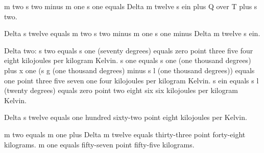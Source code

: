 m two s two minus m one s one equals Delta m twelve s ein plus Q over T plus s two.

Delta s twelve equals m two s two minus m one s one minus Delta m twelve s ein.

Delta two:
s two equals s one (seventy degrees) equals zero point three five four eight kilojoules per kilogram Kelvin.
s one equals s one (one thousand degrees) plus x one (s g (one thousand degrees) minus s l (one thousand degrees)) equals one point three five seven one four kilojoules per kilogram Kelvin.
s ein equals s l (twenty degrees) equals zero point two eight six six kilojoules per kilogram Kelvin.

Delta s twelve equals one hundred sixty-two point eight kilojoules per Kelvin. 

m two equals m one plus Delta m twelve equals thirty-three point forty-eight kilograms.
m one equals fifty-seven point fifty-five kilograms.